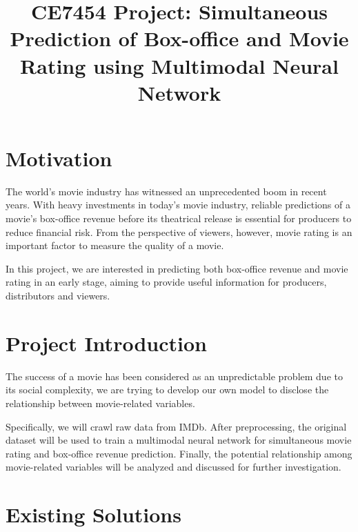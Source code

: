 \documentclass[conference]{IEEEtran}
\begin{document}
\title{CE7454 Project: Simultaneous Prediction of Box-office and Movie Rating using Multimodal Neural Network}

\author{
}
\maketitle

\renewcommand{\thefootnote}{\fnsymbol{footnote}}

\section{Motivation}

The world's movie industry has witnessed an unprecedented boom in recent years. With heavy investments in today's movie industry, reliable predictions of a movie's box-office revenue before its theatrical release is essential for producers to reduce financial risk. From the perspective of viewers, however, movie rating is an important factor to measure the quality of a movie.

In this project, we are interested in predicting both box-office revenue and movie rating in an early stage, aiming to provide useful information for producers, distributors and viewers. 

\section{Project Introduction}

The success of a movie has been considered as an unpredictable problem due to its social complexity, we are trying to develop our own model to disclose the relationship between movie-related variables.

Specifically, we will crawl raw data from IMDb. After preprocessing, the original dataset will be used to train a multimodal neural network for simultaneous movie rating and box-office revenue prediction. Finally, the potential relationship among movie-related variables will be analyzed and discussed for further investigation.

\section{Existing Solutions}
\end{document}
